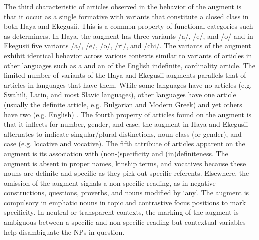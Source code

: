 \documentclass[output=paper]{langscibook}
\begin{document}
The third characteristic of articles observed in the behavior of the augment is that it occur as a single formative with variants that constitute a closed class in both Haya and Ekegusii. This is a common property of functional categories such as determiners. In Haya, the augment has three variants /a/, /e/, and /o/ and in Ekegusii five variants /a/, /e/, /o/, /ri/, and /chi/. The variants of the augment exhibit identical behavior across various contexts similar to variants of articles in other languages such as a and an of the English indefinite, cardinality article. The limited number of variants of the Haya and Ekegusii augments parallels that of articles in languages that have them. While some languages have no articles (e.g. Swahili, Latin, and most Slavic languages), other languages have one article (usually the definite article, e.g. Bulgarian and Modern Greek) and yet others have two (e.g. English)  \citep{giusti1997categorial,lyons1999definiteness}. The fourth property of articles found on the augment is that it inflects for number, gender, and case; the augment in Haya and Ekegusii alternates to indicate singular/plural distinctions, noun class (or gender), and case (e.g. locative and vocative). The fifth attribute of articles apparent on the augment is its association with (non-)specificity and (in)definiteness. The augment is absent in proper names, kinship terms, and vocatives because these nouns are definite and specific as they pick out specific referents. Elsewhere, the omission of the augment signals a non-specific reading, as in negative constructions, questions, proverbs, and nouns modified by ‘any’. The augment is compulsory in emphatic nouns in topic and contrastive focus positions to mark specificity. In neutral or transparent contexts, the marking of the augment is ambiguous between a specific and non-specific reading but contextual variables help disambiguate the NPs in question.
\end{document}
